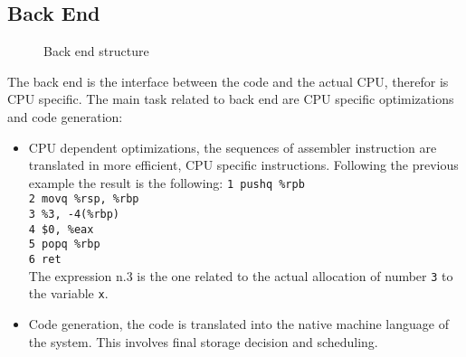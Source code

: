 \documentclass[../main.tex]{subfiles}
\begin{document}
\subsection{Back End}
\begin{figure}[h]
  \centering
{}
  \caption{Back end structure}
\end{figure}
The back end is the interface between the code and the actual CPU, therefor is CPU specific. The main task related to back end are CPU specific optimizations and code generation:
\begin{itemize}
    \item CPU dependent optimizations, the sequences of assembler instruction are translated in more efficient, CPU specific instructions. Following the previous example the result is the following:
        \texttt{1 pushq \%rpb}\\
        \texttt{2 movq \%rsp, \%rbp}\\
        \texttt{3 \%3, -4(\%rbp)}\\
        \texttt{4 \$0, \%eax}\\
        \texttt{5 popq \%rbp}\\
        \texttt{6 ret}\\
    The expression n.3 is the one related to the actual allocation of number \texttt{3} to the variable \texttt{x}.
    \item Code generation, the code is translated into the native machine language of the system. This involves final storage decision and scheduling. 
\end{itemize}
\cleardoublepage
\end{document}
